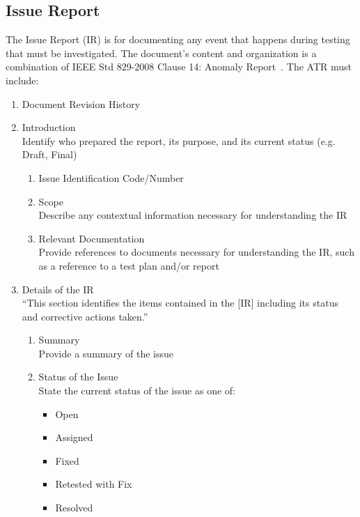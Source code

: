 \subsection{Issue Report}\label{reporting:issues}
The Issue Report (IR) is for documenting any event that happens during testing
that must be investigated. The document's content and organization is a
combination of IEEE Std 829-2008 Clause 14: Anomaly Report~\citep{vvDocIEEE}.
The ATR must include:
\begin{enumerate}

    \item Document Revision History

    \item Introduction \\
    Identify who prepared the report, its purpose, and its current status (e.g.
    Draft, Final)
    \begin{enumerate}

        \item Issue Identification Code/Number

        \item Scope \\
        Describe any contextual information necessary for understanding the IR

        \item Relevant Documentation \\
        Provide references to documents necessary for understanding the IR,
        such as a reference to a test plan and/or report

    \end{enumerate}

    \item Details of the IR \\
    ``This section identifies the items contained in the [IR] including its
    status and corrective actions taken.''~\citep[p.~61]{vvDocIEEE}
    \begin{enumerate}

        \item Summary \\
        Provide a summary of the issue

        \item Status of the Issue \\
        State the current status of the issue as one of:
        \begin{itemize}
            \item Open
            \item Assigned
            \item Fixed
            \item Retested with Fix
            \item Resolved
        \end{itemize}


\end{enumerate}
\end{enumerate}
